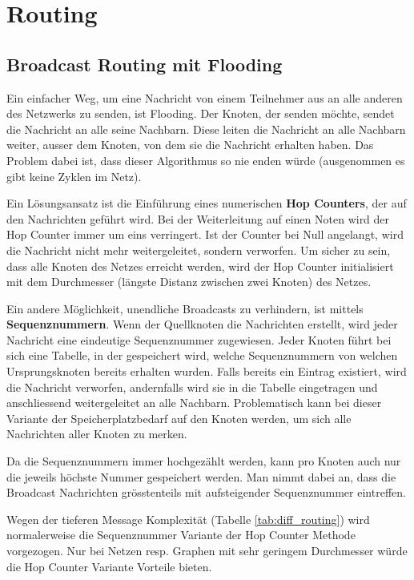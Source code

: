 \chapter{Routing}
\label{chap:routing}

\section{Broadcast Routing mit Flooding}

Ein einfacher Weg, um eine Nachricht von einem Teilnehmer aus an alle anderen des Netzwerks zu senden, ist Flooding. Der Knoten, der senden möchte, sendet die Nachricht an alle seine Nachbarn. Diese leiten die Nachricht an alle Nachbarn weiter, ausser dem Knoten, von dem sie die Nachricht erhalten haben.
Das Problem dabei ist, dass dieser Algorithmus so nie enden würde (ausgenommen es gibt keine Zyklen im Netz).

Ein Lösungsansatz ist die Einführung eines numerischen \textbf{Hop Counters}, der auf den Nachrichten geführt wird. Bei der Weiterleitung auf einen Noten wird der Hop Counter immer um eins verringert. Ist der Counter bei Null angelangt, wird die Nachricht nicht mehr weitergeleitet, sondern verworfen.
Um sicher zu sein, dass alle Knoten des Netzes erreicht werden, wird der Hop Counter initialisiert mit dem Durchmesser (längste Distanz zwischen zwei Knoten) des Netzes.

Ein andere Möglichkeit, unendliche Broadcasts zu verhindern, ist mittels \textbf{Sequenznummern}. Wenn der Quellknoten die Nachrichten erstellt, wird jeder Nachricht eine eindeutige Sequenznummer zugewiesen. Jeder Knoten führt bei sich eine Tabelle, in der gespeichert wird, welche Sequenznummern von welchen Ursprungsknoten bereits erhalten wurden. Falls bereits ein Eintrag existiert, wird die Nachricht verworfen, andernfalls wird sie in die Tabelle eingetragen und anschliessend weitergeleitet an alle Nachbarn. 
Problematisch kann bei dieser Variante der Speicherplatzbedarf auf den Knoten werden, um sich alle Nachrichten aller Knoten zu merken.

Da die Sequenznummern immer hochgezählt werden, kann pro Knoten auch nur die jeweils höchste Nummer gespeichert werden. Man nimmt dabei an, dass die Broadcast Nachrichten grösstenteils mit aufsteigender Sequenznummer eintreffen.


Wegen der tieferen Message Komplexität (Tabelle \ref{tab:diff_routing}) wird normalerweise die Sequenznummer Variante der Hop Counter Methode vorgezogen. Nur bei Netzen resp. Graphen mit sehr geringem Durchmesser würde die Hop Counter Variante Vorteile bieten. 


